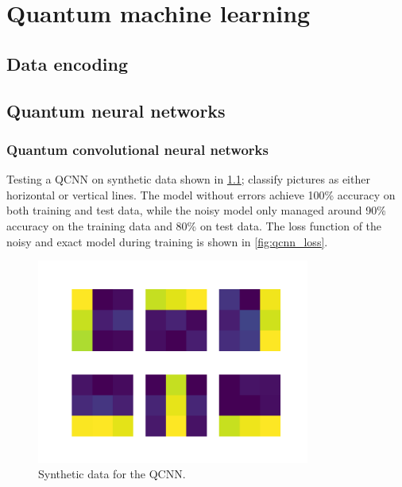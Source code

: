 \chapter{Quantum machine learning}

\section{Data encoding}

\section{Quantum neural networks}

\subsection{Quantum convolutional neural networks}
Testing a QCNN on synthetic data shown in \cref{fig:qcnn_data}; classify pictures as either horizontal or vertical lines. The model without errors achieve 100\% accuracy on both training and test data, while the noisy model only managed around 90\% accuracy on the training data and 80\% on test data. The loss function of the noisy and exact model during training is shown in \cref{fig:qcnn_loss}.


\begin{figure}
    \centering
    \includegraphics[width=0.8\textwidth]{../code/qcnn/data.pdf}
    \caption{Synthetic data for the QCNN.}
    \label{fig:qcnn_data}
\end{figure}


